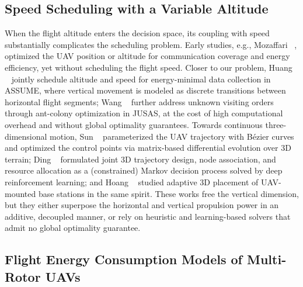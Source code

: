 \subsection{Speed Scheduling with a Variable Altitude}

When the flight altitude enters the decision space, its coupling with speed substantially complicates the scheduling problem.
Early studies, e.g., Mozaffari \etal~\cite{Mobile-UAVs-for-IoT}, optimized the UAV position or altitude for communication coverage and energy efficiency, yet without scheduling the flight speed.
Closer to our problem, Huang \etal~\cite{assume} jointly schedule altitude and speed for energy-minimal data collection in ASSUME, where vertical movement is modeled as discrete transitions between horizontal flight segments; Wang \etal~\cite{joint} further address unknown visiting orders through ant-colony optimization in JUSAS, at the cost of high computational overhead and without global optimality guarantees.
Towards continuous three-dimensional motion, Sun \etal~\cite{Matrix-Based-Evolutionary-Computation} parameterized the UAV trajectory with Bézier curves and optimized the control points via matrix-based differential evolution over 3D terrain; Ding \etal~\cite{3D-Trajectory-and-Frequency-Band} formulated joint 3D trajectory design, node association, and resource allocation as a (constrained) Markov decision process solved by deep reinforcement learning; and Hoang \etal~\cite{Adaptive-3D-Placement} studied adaptive 3D placement of UAV-mounted base stations in the same spirit.
These works free the vertical dimension, but they either superpose the horizontal and vertical propulsion power in an additive, decoupled manner, or rely on heuristic and learning-based solvers that admit no global optimality guarantee.

\subsection{Flight Energy Consumption Models of Multi-Rotor UAVs}

